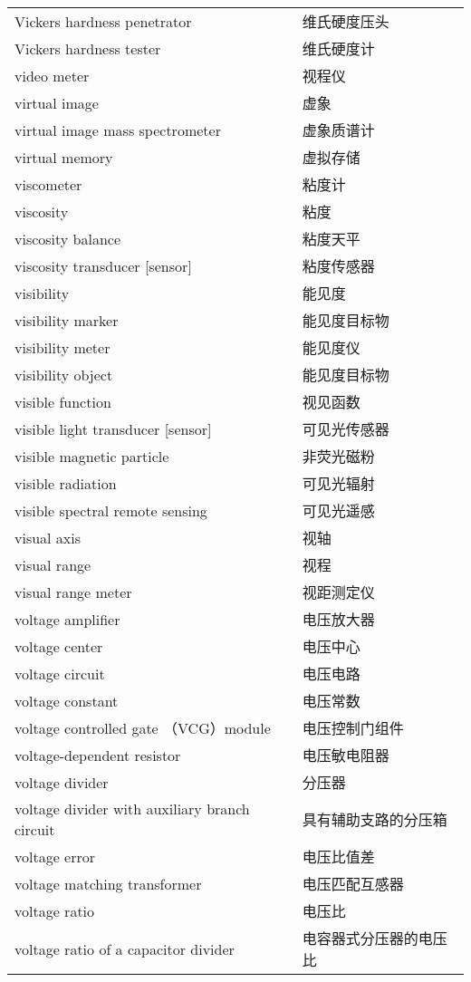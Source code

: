 \documentclass[
]{article}
\begin{document}
\begin{longtable}[]{@{}ll@{}}
Vickers hardness penetrator & 维氏硬度压头 \\
Vickers hardness tester & 维氏硬度计 \\
video meter & 视程仪 \\
virtual image & 虚象 \\
virtual image mass spectrometer & 虚象质谱计 \\
virtual memory & 虚拟存储 \\
viscometer & 粘度计 \\
viscosity & 粘度 \\
viscosity balance & 粘度天平 \\
viscosity transducer {[}sensor{]} & 粘度传感器 \\
visibility & 能见度 \\
visibility marker & 能见度目标物 \\
visibility meter & 能见度仪 \\
visibility object & 能见度目标物 \\
visible function & 视见函数 \\
visible light transducer {[}sensor{]} & 可见光传感器 \\
visible magnetic particle & 非荧光磁粉 \\
visible radiation & 可见光辐射 \\
visible spectral remote sensing & 可见光遥感 \\
visual axis & 视轴 \\
visual range & 视程 \\
visual range meter & 视距测定仪 \\
voltage amplifier & 电压放大器 \\
voltage center & 电压中心 \\
voltage circuit & 电压电路 \\
voltage constant & 电压常数 \\
voltage controlled gate （VCG）module & 电压控制门组件 \\
voltage-dependent resistor & 电压敏电阻器 \\
voltage divider & 分压器 \\
voltage divider with auxiliary branch circuit & 具有辅助支路的分压箱 \\
voltage error & 电压比值差 \\
voltage matching transformer & 电压匹配互感器 \\
voltage ratio & 电压比 \\
voltage ratio of a capacitor divider & 电容器式分压器的电压比 \\

\end{longtable}
\end{document}
